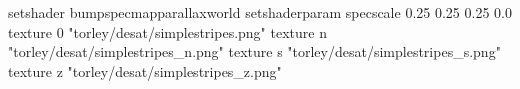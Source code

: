 setshader bumpspecmapparallaxworld
setshaderparam specscale 0.25 0.25 0.25 0.0
texture 0 "torley/desat/simplestripes.png"
texture n "torley/desat/simplestripes_n.png"
texture s "torley/desat/simplestripes_s.png"
texture z "torley/desat/simplestripes_z.png"

